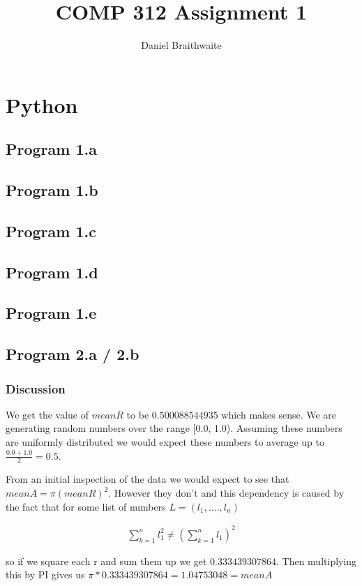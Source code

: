 \documentclass{article}
\title{COMP 312 Assignment 1}
\author{Daniel Braithwaite}
\begin{document}
	\maketitle
	\newpage
  	
  	\section{Python}
  		\subsection{Program 1.a}
  			
  			
  		\subsection{Program 1.b}
  			
  			
  		\subsection{Program 1.c}
  			
  			
  		\subsection{Program 1.d}
  			
  			
  		\subsection{Program 1.e}
  			
  			
  		\subsection{Program 2.a / 2.b}
  			
  			
  			\subsubsection{Discussion}
  				We get the value of $meanR$ to be $0.500088544935$ which makes sense. We are generating random numbers over the range [0.0, 1.0). Assuming these numbers are uniformly distributed we would expect these numbers to average up to $\frac{0.0 + 1.0}{2} = 0.5$.
  				
  				From an initial inspection of the data we would expect to see that $meanA = \pi(meanR)^2$. However they don't and this dependency is caused by the fact that for some list of numbers $L = (l_1, ...., l_n)$
  				
  				\begin{align*}
  					\sum_{k=1}^{n} l_1^2 \neq (\sum_{k=1}^{n} l_1)^2
  				\end{align*}
  				
  				so if we square each r and sum them up we get $0.333439307864$. Then multiplying this by PI gives us $\pi * 0.333439307864 = 1.04753048 = meanA$
\end{document}
